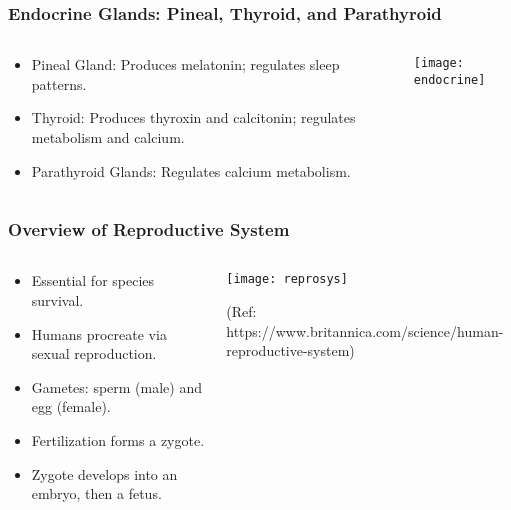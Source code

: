 \begin{frame}[fragile]\frametitle{Endocrine Glands: Pineal, Thyroid, and Parathyroid}
\begin{columns}
    \begin{column}[T]{0.5\linewidth}
      \begin{itemize}
		\item Pineal Gland: Produces melatonin; regulates sleep patterns.
		\item Thyroid: Produces thyroxin and calcitonin; regulates metabolism and calcium.
		\item Parathyroid Glands: Regulates calcium metabolism.
	  \end{itemize}
    \end{column}
    \begin{column}[T]{0.5\linewidth}
		\begin{center}
		\texttt{[image: endocrine]}
		\end{center}	
    \end{column}
  \end{columns}
\end{frame}

\begin{frame}[fragile]\frametitle{Overview of Reproductive System}
\begin{columns}
    \begin{column}[T]{0.5\linewidth}
      \begin{itemize}
		\item Essential for species survival.
		\item Humans procreate via sexual reproduction.
		\item Gametes: sperm (male) and egg (female).
		\item Fertilization forms a zygote.
		\item Zygote develops into an embryo, then a fetus.
	  \end{itemize}
    \end{column}
    \begin{column}[T]{0.5\linewidth}
		\begin{center}
		\texttt{[image: reprosys]}

		
		{\tiny (Ref: https://www.britannica.com/science/human-reproductive-system)}		
		\end{center}	
    \end{column}
  \end{columns}
\end{frame}

